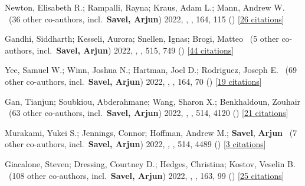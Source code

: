 \item[{\color{numcolor}\scriptsize15}] Newton, Elisabeth R.; Rampalli, Rayna; Kraus, Adam L.; Mann, Andrew W. \etal\ ({36} other co-authors, incl.\ \textbf{Savel, Arjun}) 2022, , \aj, {164}, 115 () [\href{https://ui.adsabs.harvard.edu/abs/2022AJ....164..115N}{26 citations}]

\item[{\color{numcolor}\scriptsize14}] Gandhi, Siddharth; Kesseli, Aurora; Snellen, Ignas; Brogi, Matteo \etal\ ({5} other co-authors, incl.\ \textbf{Savel, Arjun}) 2022, , \mnras, {515}, 749 () [\href{https://ui.adsabs.harvard.edu/abs/2022MNRAS.515..749G}{44 citations}]

\item[{\color{numcolor}\scriptsize13}] Yee, Samuel W.; Winn, Joshua N.; Hartman, Joel D.; Rodriguez, Joseph E. \etal\ ({69} other co-authors, incl.\ \textbf{Savel, Arjun}) 2022, , \aj, {164}, 70 () [\href{https://ui.adsabs.harvard.edu/abs/2022AJ....164...70Y}{19 citations}]

\item[{\color{numcolor}\scriptsize12}] Gan, Tianjun; Soubkiou, Abderahmane; Wang, Sharon X.; Benkhaldoun, Zouhair \etal\ ({63} other co-authors, incl.\ \textbf{Savel, Arjun}) 2022, , \mnras, {514}, 4120 () [\href{https://ui.adsabs.harvard.edu/abs/2022MNRAS.514.4120G}{21 citations}]

\item[{\color{numcolor}\scriptsize11}] Murakami, Yukei S.; Jennings, Connor; Hoffman, Andrew M.; \textbf{Savel}, \textbf{Arjun} \etal\ ({7} other co-authors, incl.\ \textbf{Savel, Arjun}) 2022, , \mnras, {514}, 4489 () [\href{https://ui.adsabs.harvard.edu/abs/2022MNRAS.514.4489M}{3 citations}]

\item[{\color{numcolor}\scriptsize10}] Giacalone, Steven; Dressing, Courtney D.; Hedges, Christina; Kostov, Veselin B. \etal\ ({108} other co-authors, incl.\ \textbf{Savel, Arjun}) 2022, , \aj, {163}, 99 () [\href{https://ui.adsabs.harvard.edu/abs/2022AJ....163...99G}{25 citations}]


